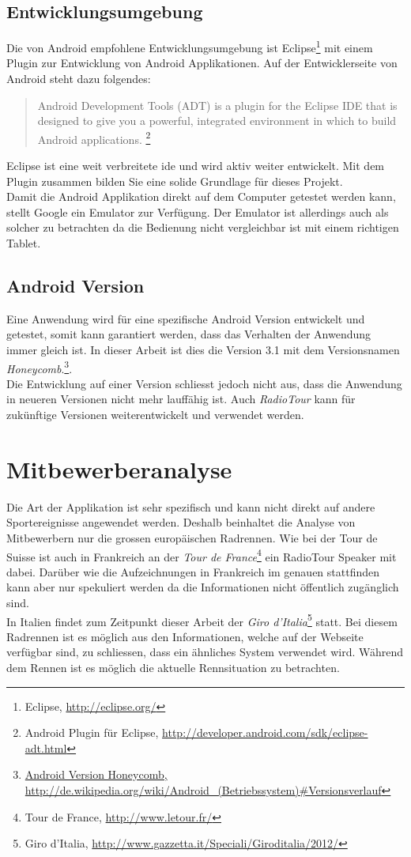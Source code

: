\subsection{Entwicklungsumgebung}
Die von Android empfohlene Entwicklungsumgebung ist Eclipse\footnote{Eclipse, \url{http://eclipse.org/}} mit einem Plugin zur Entwicklung von Android Applikationen. Auf der Entwicklerseite von Android steht dazu folgendes:
\begin{quote}
\grqq Android Development Tools (ADT) is a plugin for the Eclipse IDE that is designed to give you a powerful, integrated environment in which to build Android applications.\grqq
\footnote{Android Plugin für Eclipse, \url{http://developer.android.com/sdk/eclipse-adt.html}}
\end{quote}
Eclipse ist eine weit verbreitete \gls{ide} und wird aktiv weiter entwickelt. Mit dem Plugin zusammen bilden Sie eine solide Grundlage für dieses Projekt.
\\
Damit die Android Applikation direkt auf dem Computer getestet werden kann, stellt Google ein Emulator zur Verfügung. Der Emulator ist allerdings auch als solcher zu betrachten da die Bedienung nicht vergleichbar ist mit einem richtigen Tablet.

\subsection{Android Version}
Eine Anwendung wird für eine spezifische Android Version entwickelt und getestet, somit kann garantiert werden, dass das Verhalten der Anwendung  immer gleich ist. In dieser Arbeit ist dies die Version 3.1 mit dem Versionsnamen \textit{Honeycomb}.\footnote{\url{Android Version Honeycomb, http://de.wikipedia.org/wiki/Android_(Betriebssystem)\#Versionsverlauf}}.
\\
Die Entwicklung auf einer Version schliesst jedoch nicht aus, dass die Anwendung in neueren Versionen nicht mehr lauffähig ist. Auch \textit{RadioTour} kann für zukünftige Versionen weiterentwickelt und verwendet werden.

\section{Mitbewerberanalyse}
Die Art der Applikation ist sehr spezifisch und kann nicht direkt auf andere Sportereignisse angewendet werden. Deshalb beinhaltet die Analyse von Mitbewerbern nur die grossen europäischen Radrennen. Wie bei der Tour de Suisse ist auch in Frankreich an der \textit{Tour de France}\footnote{Tour de France, \url{http://www.letour.fr/}} ein RadioTour Speaker mit dabei. Darüber wie die Aufzeichnungen in Frankreich im genauen stattfinden kann aber nur spekuliert werden da die Informationen nicht öffentlich zugänglich sind.
\\
In Italien findet zum Zeitpunkt dieser Arbeit der \textit{Giro d'Italia}\footnote{Giro d'Italia, \url{http://www.gazzetta.it/Speciali/Giroditalia/2012/}} statt. Bei diesem Radrennen ist es möglich aus den Informationen, welche auf der Webseite verfügbar sind, zu schliessen, dass ein ähnliches System verwendet wird. Während dem Rennen ist es möglich die aktuelle Rennsituation zu betrachten.


